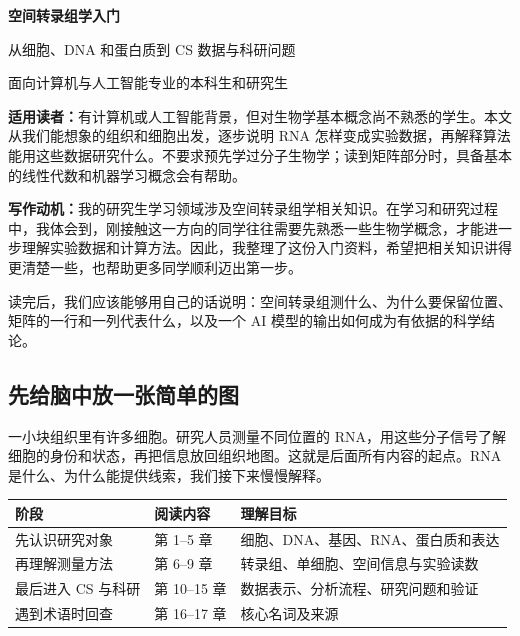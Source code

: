 \documentclass[UTF8,a4paper,11pt,fontset=fandol]{ctexart}
\begin{document}
\color{bodytext}

\begin{center}
  {\LARGE\bfseries\color{accent}空间转录组学入门\par}
  \vspace{0.7em}
  {\large\color{tealaccent}从细胞、DNA 和蛋白质到 CS 数据与科研问题\par}
  \vspace{0.6em}
  {\color{muted}面向计算机与人工智能专业的本科生和研究生\par}
\end{center}
\noindent{\color{accent!50}\rule{\linewidth}{0.6pt}}

\noindent\textbf{适用读者：}有计算机或人工智能背景，但对生物学基本概念尚不熟悉的学生。本文从我们能想象的组织和细胞出发，逐步说明 RNA 怎样变成实验数据，再解释算法能用这些数据研究什么。不要求预先学过分子生物学；读到矩阵部分时，具备基本的线性代数和机器学习概念会有帮助。

\noindent\textbf{写作动机：}我的研究生学习领域涉及空间转录组学相关知识。在学习和研究过程中，我体会到，刚接触这一方向的同学往往需要先熟悉一些生物学概念，才能进一步理解实验数据和计算方法。因此，我整理了这份入门资料，希望把相关知识讲得更清楚一些，也帮助更多同学顺利迈出第一步。

读完后，我们应该能够用自己的话说明：空间转录组测什么、为什么要保留位置、矩阵的一行和一列代表什么，以及一个 AI 模型的输出如何成为有依据的科学结论。

\subsection*{先给脑中放一张简单的图}
一小块组织里有许多细胞。研究人员测量不同位置的 RNA，用这些分子信号了解细胞的身份和状态，再把信息放回组织地图。这就是后面所有内容的起点。RNA 是什么、为什么能提供线索，我们接下来慢慢解释。

\begin{center}
\begin{tabularx}{\linewidth}{@{}l l Y@{}}
\toprule
{}
阶段 & 阅读内容 & 理解目标 \\
\midrule
先认识研究对象 & 第 1--5 章 & 细胞、DNA、基因、RNA、蛋白质和表达 \\
再理解测量方法 & 第 6--9 章 & 转录组、单细胞、空间信息与实验读数 \\
最后进入 CS 与科研 & 第 10--15 章 & 数据表示、分析流程、研究问题和验证 \\
遇到术语时回查 & 第 16--17 章 & 核心名词及来源 \\
\bottomrule
\end{tabularx}
\end{center}
\end{document}
